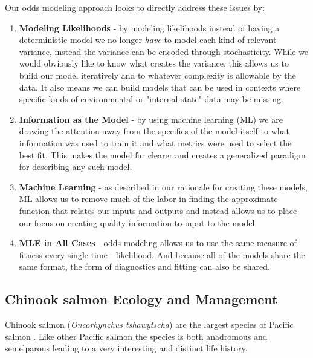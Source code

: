 \documentclass[11pt]{article}
\begin{document}
Our odds modeling approach looks to directly address these issues by:

\begin{enumerate}
\item \textbf{Modeling Likelihoods} - by modeling likelihoods instead of having a deterministic model we no longer \textit{have} to model each kind of relevant variance, instead the variance can be encoded through stochasticity. While we would obviously like to know what creates the variance, this allows us to build our model iteratively and to whatever complexity is allowable by the data. It also means we can build models that can be used in contexts where specific kinds of environmental or "internal state" data may be missing.
\item \textbf{Information as the Model} - by using machine learning (ML) we are drawing the attention away from the specifics of the model itself to what information was used to train it and what metrics were used to select the best fit. This makes the model far clearer and creates a generalized paradigm for describing any such model.
\item \textbf{Machine Learning} - as described in our rationale for creating these models, ML allows us to remove much of the labor in finding the approximate function that relates our inputs and outputs and instead allows us to place our focus on creating quality information to input to the model.
\item \textbf{MLE in All Cases} - odds modeling allows us to use the same measure of fitness every single time - likelihood. And because all of the models share the same format, the form of diagnostics and fitting can also be shared.
\end{enumerate}



\newpage











\subsection{Chinook salmon Ecology and Management}


Chinook salmon (\textit{Oncorhynchus tshawytscha}) are the largest species of Pacific salmon \citep{oceanchinook}. Like other Pacific salmon the species is both anadromous and semelparous leading to a very interesting and distinct life history. 
\end{document}
